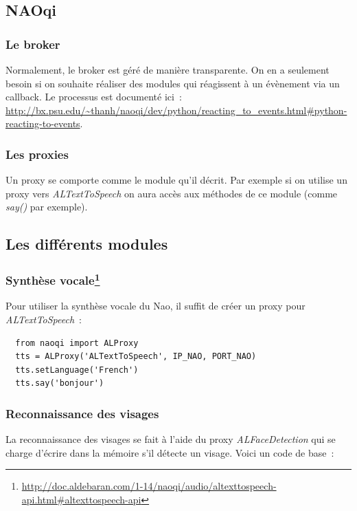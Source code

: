\documentclass{article}
\begin{document}
\subsection{NAOqi}

\subsubsection{Le broker}

Normalement, le broker est géré de manière transparente. On en a seulement besoin si on souhaite réaliser des modules qui réagissent à un évènement via un callback. Le processus est documenté ici~: \url{http://bx.psu.edu/~thanh/naoqi/dev/python/reacting_to_events.html#python-reacting-to-events}.

\subsubsection{Les proxies}

Un proxy se comporte comme le module qu'il décrit. Par exemple si on utilise un proxy vers \emph{ALTextToSpeech} on aura accès aux méthodes de ce module (comme \emph{say()} par exemple).

\subsection{Les différents modules}

\subsubsection{Synthèse vocale\footnote{\url{http://doc.aldebaran.com/1-14/naoqi/audio/altexttospeech-api.html#altexttospeech-api}}}

Pour utiliser la synthèse vocale du Nao, il suffit de créer un proxy pour \emph{ALTextToSpeech}~:

\begin{verbatim}
  from naoqi import ALProxy
  tts = ALProxy('ALTextToSpeech', IP_NAO, PORT_NAO)
  tts.setLanguage('French')
  tts.say('bonjour')
\end{verbatim}

\subsubsection{Reconnaissance des visages}

La reconnaissance des visages se fait à l'aide du proxy \emph{ALFaceDetection} qui se charge d'écrire dans la mémoire s'il détecte un visage. Voici un code de base~:
\end{document}
